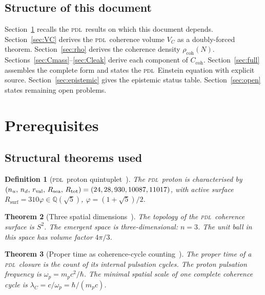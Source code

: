 \documentclass[12pt,a4paper]{article}
\newtheorem{theorem}{Theorem}[section]
\newtheorem{definition}[theorem]{Definition}
\newcommand{\hb}{\hbar}
\newcommand{\PDL}{\textsc{pdl}}
\newcommand{\Ccoh}{C_{\mathrm{coh}}}
\newcommand{\rhocoh}{\rho_{\mathrm{coh}}}
\newcommand{\Rsurf}{R_{\mathrm{surf}}}
\newcommand{\Rtot}{R_{\mathrm{tot}}}
\newcommand{\Rsea}{R_{\mathrm{sea}}}
\newcommand{\rval}{r_{\mathrm{val}}}
\newcommand{\lambdaC}{\lambda_C}
\newcommand{\VC}{V_C}
\newcommand{\vp}{\varphi}
\newcommand{\nuu}{n_u}
\newcommand{\quintuplet}{(24,28,930,10087,11017)}
\begin{document}
\subsection{Structure of this document}

Section~\ref{sec:prereq} recalls the \PDL\ results on which this document depends. Section~\ref{sec:VC} derives the \PDL\ coherence volume $\VC$ as a doubly-forced theorem. Section~\ref{sec:rho} derives the coherence density $\rhocoh(N)$. Sections~\ref{sec:Cmass}--\ref{sec:Cleak} derive each component of $\Ccoh$. Section~\ref{sec:full} assembles the complete form and states the \PDL\ Einstein equation with explicit source. Section~\ref{sec:epistemic} gives the epistemic status table. Section~\ref{sec:open} states remaining open problems.

\section{Prerequisites}
\label{sec:prereq}

\subsection{Structural theorems used}

\begin{definition}[\PDL\ proton quintuplet~{\cite{PDL_D16b_2026,PDL_D29_2026}}]
\label{def:quintuplet}
The \PDL\ proton is characterised by $(\nuu,\,n_d,\,\rval, \\ \,\Rsea,\,\Rtot) = \quintuplet$, with active surface $\Rsurf = 310\vp \in \mathbb{Q}(\sqrt{5})$, $\vp = (1+\sqrt{5})/2$.
\end{definition}

\begin{theorem}[Three spatial dimensions~{\cite{PDL_D23_2026}}]
\label{thm:D23}
The topology of the \PDL\ coherence surface is $S^2$. The emergent space is three-dimensional: $n = 3$. The unit ball in this space has volume factor $4\pi/3$.
\end{theorem}

\begin{theorem}[Proper time as coherence-cycle counting~{\cite{PDL_D10a_2026}}]
\label{thm:D10a}
The proper time of a \PDL\ closure is the count of its internal pulsation cycles. The proton pulsation frequency is $\omega_p = m_p c^2/\hb$. The minimal spatial scale of one complete coherence cycle is $\lambdaC = c/\omega_p = \hb/(m_p c)$.
\end{theorem}
\end{document}
